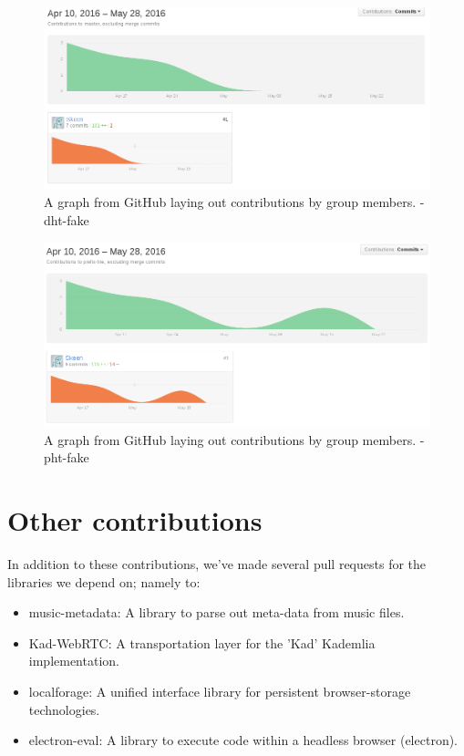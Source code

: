 \begin{figure}[H]
  \centering
    \includegraphics[width=\linewidth]{gfx/dht-fake}
    \caption{A graph from GitHub laying out contributions by group members. - dht-fake}
  \label{fig:music-stramer-library}
\end{figure}

\begin{figure}[H]
  \centering
    \includegraphics[width=\linewidth]{gfx/pht-fake}
    \caption{A graph from GitHub laying out contributions by group members. - pht-fake}
  \label{fig:music-stramer-library}
\end{figure}

\section{Other contributions}
In addition to these contributions, we've made several pull requests for the
libraries we depend on; namely to:
\begin{itemize}
\item music-metadata: A library to parse out meta-data from music files.
\item Kad-WebRTC: A transportation layer for the 'Kad' Kademlia implementation.
\item localforage: A unified interface library for persistent browser-storage
    technologies.
\item electron-eval: A library to execute code within a headless browser
    (electron).
\end{itemize}

